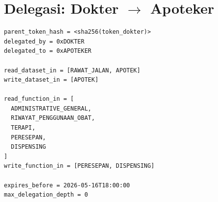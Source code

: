 \section*{Delegasi: Dokter $\rightarrow$ Apoteker}
\label{subsec:contoh-caveat-token-macaroon-delegasi-apoteker}

\begin{lstlisting}[caption={Contoh \textit{Caveat} Delegasi Dokter $\rightarrow$ Apoteker}, label={lst:contoh-token-delegasi-apoteker}]
parent_token_hash = <sha256(token_dokter)>
delegated_by = 0xDOKTER
delegated_to = 0xAPOTEKER

read_dataset_in = [RAWAT_JALAN, APOTEK]
write_dataset_in = [APOTEK]

read_function_in = [
  ADMINISTRATIVE_GENERAL,
  RIWAYAT_PENGGUNAAN_OBAT,
  TERAPI,
  PERESEPAN,
  DISPENSING
]
write_function_in = [PERESEPAN, DISPENSING]

expires_before = 2026-05-16T18:00:00
max_delegation_depth = 0
\end{lstlisting}
